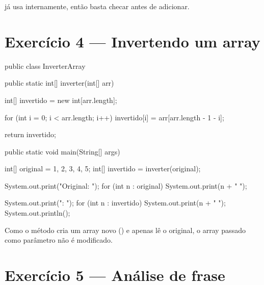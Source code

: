 \documentclass[11pt,a4paper]{article}
\begin{document}
 já usa  internamente, então basta checar  antes de adicionar.

\section{Exercício 4 --- Invertendo um array}

\begin{javacode}
public class InverterArray {

    public static int[] inverter(int[] arr) {
        int[] invertido = new int[arr.length];

        for (int i = 0; i < arr.length; i++) {
            invertido[i] = arr[arr.length - 1 - i];
        }

        return invertido;
    }

    public static void main(String[] args) {
        int[] original = {1, 2, 3, 4, 5};
        int[] invertido = inverter(original);

        System.out.print("Original: ");
        for (int n : original) System.out.print(n + " ");

        System.out.print("\nInvertido: ");
        for (int n : invertido) System.out.print(n + " ");
        System.out.println();
    }
}
\end{javacode}

\begin{destaque}
Como o método cria um array novo () e apenas lê o  original, o array passado como parâmetro não é modificado.
\end{destaque}

\section{Exercício 5 --- Análise de frase}
\end{document}
